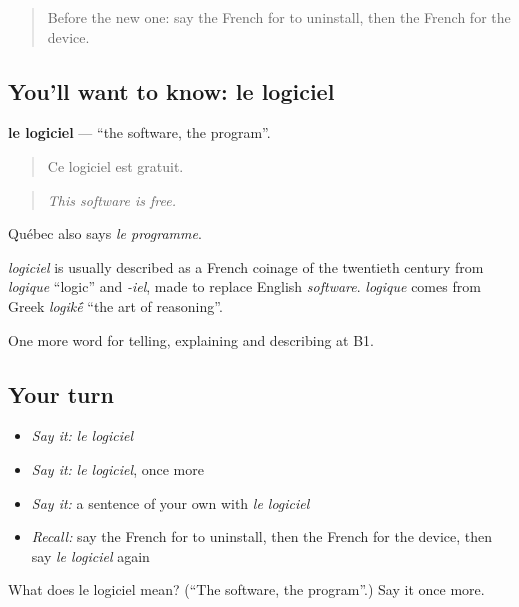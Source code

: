 \begin{quote}
Before the new one: say the French for to uninstall, then the French for the device.
\end{quote}

\subsection*{You'll want to know: le logiciel}
\textbf{le logiciel} — \textquotedblleft{}the software, the program\textquotedblright{}.

\begin{quote}
Ce logiciel est gratuit.
\end{quote}

\begin{quote}
\emph{This software is free.}
\end{quote}

Québec also says \emph{le programme}.

\begin{cousinweb}
\emph{logiciel} is usually described as a French coinage of the twentieth century from \emph{logique} \textquotedblleft{}logic\textquotedblright{} and \emph{-iel}, made to replace English \emph{software}. \emph{logique} comes from Greek \emph{logik\'{\={e}}} \textquotedblleft{}the art of reasoning\textquotedblright{}.
\end{cousinweb}

\begin{grammarlens}[title={What you've built}]
One more word for telling, explaining and describing at B1.
\end{grammarlens}

\subsection*{Your turn}
\begin{itemize}
\raggedright
  \item \emph{Say it:} \emph{le logiciel}
  \item \emph{Say it:} \emph{le logiciel}, once more
  \item \emph{Say it:} a sentence of your own with \emph{le logiciel}
  \item \emph{Recall:} say the French for to uninstall, then the French for the device, then say \emph{le logiciel} again
\end{itemize}

\begin{tcolorbox}[breakable,colback=teal!4,colframe=teal!35!black,title={Before you move on}]
What does le logiciel mean? (\textquotedblleft{}The software, the program\textquotedblright{}.) Say it once more.
\end{tcolorbox}
